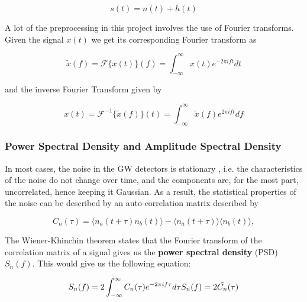 \documentclass[12pt]{article}
\begin{document}
\begin{equation}
    s(t) = n(t) + h(t)
    \label{eq:strain_output}
\end{equation}

\medskip
\noindent A lot of the preprocessing in this project involves the use of Fourier transforms. Given the signal $x(t)$ we get its corresponding Fourier transform as

\begin{equation}
    \tilde{x}(f) = \mathcal{F}\{ x(t) \} (f) = \int_{-\infty}^{\infty} x(t) e^{-2 \pi i f t} dt
    \label{eq:fourier_transform}
\end{equation}

\medskip
\noindent and the inverse Fourier Transform given by

\begin{equation}
  x(t) = \mathcal{F}^{-1} \{ \tilde{x}(f) \} (t) = \int_{-\infty}^{\infty} \tilde{x}(f) e^{2 \pi i f t} df
  \label{eq:inverse_fourier_transform}
\end{equation}

\subsubsection{Power Spectral Density and Amplitude Spectral Density}\label{PSD_ASD}

\noindent In most cases, the noise in the GW detectors is stationary \cite{collaboration_characterization_2016}, i.e. the characteristics of the noise do not change over time, and the components are, for the most part, uncorrelated, hence keeping it Gaussian. As a result, the statistical properties of the noise can be described by an auto-correlation matrix described by

\begin{equation}
    C_n(\tau) = \langle n_a(t+\tau) n_b(t) \rangle - \langle n_a(t+\tau) \rangle \langle n_b(t) \rangle,
    \label{eq:autocorrelation}
\end{equation}

\medskip
\noindent The Wiener-Khinchin theorem \cite{chatfield1989analysis} states that the Fourier transform of the correlation matrix of a signal gives us the \textbf{power spectral density} (PSD) $S_n(f)$. This would give us the following equation:

\begin{equation}
  S_n(f) = 2 \int_{-\infty}^{\infty} C_n(\tau) e^{-2 \pi i f \tau} d\tau \\
  S_n(f) = 2 \tilde{C_n}(\tau) \\
  \label{eq:psd_autocorrelation}
\end{equation}
\end{document}

